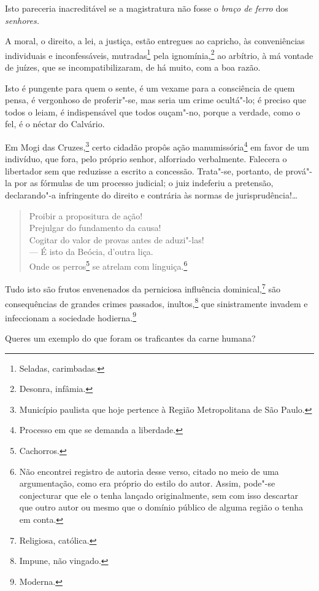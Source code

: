 Isto pareceria inacreditável se a magistratura não fosse o \emph{braço
de ferro} dos \emph{senhores.}

A moral, o direito, a lei, a justiça, estão entregues ao capricho, às
conveniências individuais e inconfessáveis, mutradas\footnote{Seladas,
  carimbadas.} pela ignomínia,\footnote{Desonra, infâmia.} ao
arbítrio, à má vontade de juízes, que se incompatibilizaram, de há
muito, com a boa razão.

Isto é pungente para quem o sente, é um vexame para a consciência de
quem pensa, é vergonhoso de proferir"-se, mas seria um crime ocultá"-lo; é
preciso que todos o leiam, é indispensável que todos ouçam"-no, porque a
verdade, como o fel, é o néctar do Calvário.

Em Mogi das Cruzes,\footnote{Município paulista que hoje pertence à
  Região Metropolitana de São Paulo.} certo cidadão propôs ação
manumissória\footnote{Processo em que se demanda a liberdade.} em
favor de um indivíduo, que fora, pelo próprio senhor, alforriado
verbalmente. Falecera o libertador sem que reduzisse a escrito a
concessão. Trata"-se, portanto, de prová"-la por as fórmulas de um
processo judicial; o juiz indeferiu a pretensão, declarando"-a
infringente do direito e contrária às normas de jurisprudência!\ldots{}

\begin{verse}
Proibir a propositura de ação!\\
Prejulgar do fundamento da causa!\\
Cogitar do valor de provas antes de aduzi"-las!\\
--- É isto da Beócia, d'outra liça.\\
Onde os perros\footnote{Cachorros.} se atrelam com linguiça.\footnote{
  Não encontrei registro de autoria desse verso, citado no meio de uma
  argumentação, como era próprio do estilo do autor. Assim, pode"-se
  conjecturar que ele o tenha lançado originalmente, sem com isso
  descartar que outro autor ou mesmo que o domínio público de alguma
  região o tenha em conta.}
\end{verse}  

Tudo isto são frutos envenenados da perniciosa influência
dominical,\footnote{Religiosa, católica.} são consequências de grandes
crimes passados, inultos,\footnote{Impune, não vingado.} que
sinistramente invadem e infeccionam a sociedade hodierna.\footnote{
  Moderna.}

Queres um exemplo do que foram os traficantes da carne humana?

